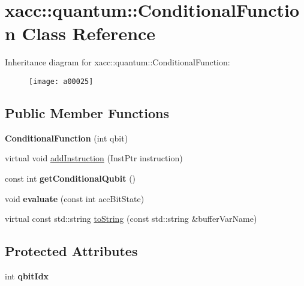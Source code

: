 \hypertarget{a00025}{}\section{xacc\+:\+:quantum\+:\+:Conditional\+Function Class Reference}
\label{a00025}
Inheritance diagram for xacc\+:\+:quantum\+:\+:Conditional\+Function\+:\begin{figure}[H]
\begin{center}
\leavevmode
\texttt{[image: a00025]}
\end{center}
\end{figure}
\subsection*{Public Member Functions}
\begin{DoxyCompactItemize}
\item 
{\bfseries Conditional\+Function} (int qbit)\hypertarget{a00025_aa28610a08ae04d62ccdd8359433100c3}{}\label{a00025_aa28610a08ae04d62ccdd8359433100c3}

\item 
virtual void \hyperlink{a00025_a6aedad20f96390880efdc0a476b3273f}{add\+Instruction} (Inst\+Ptr instruction)
\item 
const int {\bfseries get\+Conditional\+Qubit} ()\hypertarget{a00025_a804317333b6677a041a3071b5108c0df}{}\label{a00025_a804317333b6677a041a3071b5108c0df}

\item 
void {\bfseries evaluate} (const int acc\+Bit\+State)\hypertarget{a00025_a709c236a5beb62d9a3bd5265196fb6c9}{}\label{a00025_a709c236a5beb62d9a3bd5265196fb6c9}

\item 
virtual const std\+::string \hyperlink{a00025_aca7a5f849fece6fc28a904efee9a3370}{to\+String} (const std\+::string \&buffer\+Var\+Name)
\end{DoxyCompactItemize}
\subsection*{Protected Attributes}
\begin{DoxyCompactItemize}
\item 
int {\bfseries qbit\+Idx}\hypertarget{a00025_a0310536801417c0eded28a4dea1efa44}{}\label{a00025_a0310536801417c0eded28a4dea1efa44}

\end{DoxyCompactItemize}
